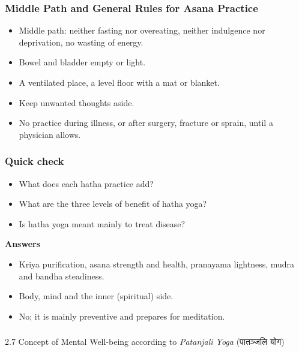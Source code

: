 \begin{frame}[fragile]\frametitle{Middle Path and General Rules for Asana Practice}

\begin{itemize}
    \item Middle path: neither fasting nor overeating, neither indulgence nor deprivation, no wasting of energy.
    \item Bowel and bladder empty or light.
    \item A ventilated place, a level floor with a mat or blanket.
    \item Keep unwanted thoughts aside.
    \item No practice during illness, or after surgery, fracture or sprain, until a physician allows.
\end{itemize}

\end{frame}

\begin{frame}[fragile]\frametitle{Quick check}

\begin{itemize}
    \item What does each hatha practice add?
    \item What are the three levels of benefit of hatha yoga?
    \item Is hatha yoga meant mainly to treat disease?
\end{itemize}
\vspace{0.5em}
\textbf{Answers}
\begin{itemize}
    \item Kriya purification, asana strength and health, pranayama lightness, mudra and bandha steadiness.
    \item Body, mind and the inner (spiritual) side.
    \item No; it is mainly preventive and prepares for meditation.
\end{itemize}

\end{frame}

\begin{frame}[fragile]\frametitle{}
\begin{center}
{\Large 2.7  Concept of Mental Well-being according to \textit{Patanjali Yoga} (पातञ्जलि योग)}
\end{center}
\end{frame}

